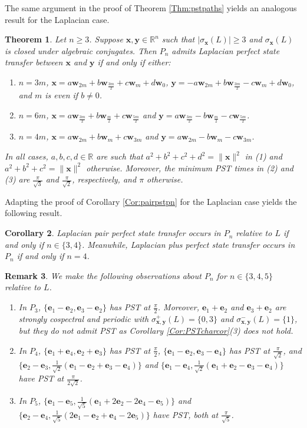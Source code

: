 \documentclass[11pt]{article}
\newtheorem{theorem}{Theorem}
\newtheorem{corollary}[theorem]{Corollary}
\newtheorem{remark}[theorem]{Remark}
\newcommand{\be}{\mathbf e}
\newcommand{\bx}{\mathbf x}
\newcommand{\by}{\mathbf y}
\newcommand{\bw}{\mathbf w}
\def\R{\mathbb{R}}
\begin{document}
The same argument in the proof of Theorem \ref{Thm:pstpaths} yields an analogous result for the Laplacian case.

\begin{theorem}
Let $n\geq 3$. Suppose $\bx,\by\in\R^n$ such that $|\sigma_{\bx}(L)|\geq 3$ and $\sigma_{\bx}(L)$ is closed under algebraic conjugates. Then $P_n$ admits Laplacian perfect state transfer between $\bx$ and $\by$ if and only if either:
\begin{enumerate}
\item $n=3m$, $\bx=a\bw_{2m}+b\bw_{\frac{3m}{2}}+c\bw_{m}+d\bw_{0}$, $\by=-a\bw_{2m}+b\bw_{\frac{3m}{2}}-c\bw_{m}+d\bw_{0}$, and $m$ is even if $b\neq 0$.
\item $n=6m$, $\bx=a\bw_{\frac{3m}{2}}+b\bw_{\frac{m}{2}}+c\bw_{\frac{5m}{2}}$ and $\by=a\bw_{\frac{3m}{2}}-b\bw_{\frac{m}{2}}-c\bw_{\frac{5m}{2}}$. 
\item $n=4m$, $\bx=a\bw_{2m}+b\bw_{m}+c\bw_{3m}$ and $\by=a\bw_{2m}-b\bw_{m}-c\bw_{3m}$.
\end{enumerate}
In all cases, $a,b,c,d\in\R$ are such that $a^2+b^2+c^2+d^2=\|\bx\|^2$ in (1) and $a^2+b^2+c^2=\|\bx\|^2$ otherwise. Moreover, the minimum PST times in (2) and (3) are $\frac{\pi}{\sqrt{3}}$ and $\frac{\pi}{\sqrt{2}}$, respectively, and $\pi$ otherwise.
\end{theorem}

Adapting the proof of Corollary \ref{Cor:pairpstpn} for the Laplacian case yields the following result.

\begin{corollary}
Laplacian pair perfect state transfer occurs in $P_n$ relative to $L$ if and only if $n\in\{3,4\}$. Meanwhile, Laplacian plus perfect state transfer occurs in $P_n$ if and only if $n=4$.
\end{corollary}

\begin{remark}
\label{Rem:pnL}
We make the following observations about $P_n$ for $n\in\{3,4,5\}$ relative to $L$.
 \begin{enumerate}
\item In $P_3$, $\{\be_1-\be_2,\be_3-\be_2\}$ has PST at $\frac{\pi}{2}$. Moreover, $\be_1+\be_2$ and $\be_3+\be_2$ are strongly cospectral and periodic with $\sigma_{\bx,\by}^+(L)=\{0,3\}$ and $\sigma_{\bx,\by}^-(L)=\{1\}$, but they do not admit PST as Corollary \ref{Cor:PSTcharcor}(3) does not hold.
\item In $P_4$, $\{\be_1+\be_4,\be_2+\be_3\}$ has PST at $\frac{\pi}{2}$, $\{\be_1-\be_2,\be_3-\be_4\}$ has PST at $\frac{\pi}{\sqrt{2}}$, and $\{\be_2-\be_3,\frac{1}{\sqrt{2}}(\be_1-\be_2+\be_3-\be_4)\}$ and $\{\be_1-\be_4,\frac{1}{\sqrt{2}}(\be_1+\be_2-\be_3-\be_4)\}$ have PST at $\frac{\pi}{2\sqrt{2}}$.
\item In $P_5$, $\{\be_1-\be_5,\frac{1}{\sqrt{5}}(\be_1+2\be_2-2\be_4-\be_5)\}$ and $\{\be_2-\be_4,\frac{1}{\sqrt{5}}(2\be_1-\be_2+\be_4-2\be_5)\}$ have PST, both at $\frac{\pi}{\sqrt{5}}$.
\end{enumerate}
\end{remark}
\end{document}
